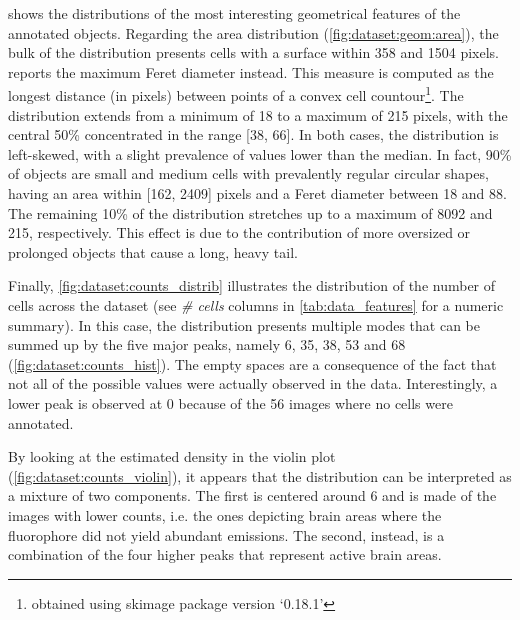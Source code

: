  shows the distributions of the most interesting geometrical features of the annotated objects.
Regarding the area distribution (\cref{fig:dataset:geom:area}), the bulk of the distribution presents cells with a surface within 358 and 1504 pixels.
 reports the maximum Feret diameter \cite{merkus2009particle} instead. This measure is computed as the longest distance (in pixels) between points of a convex cell countour\footnote{obtained using skimage package version `0.18.1'}.
The distribution extends from a minimum of 18 to a maximum of 215 pixels, with the central 50\% concentrated in the range [38, 66].
In both cases, the distribution is left-skewed, with a slight prevalence of values lower than the median.
In fact, 90\% of objects are small and medium cells with prevalently regular circular shapes, having an area within [162, 2409] pixels and a Feret diameter between 18 and 88.
The remaining 10\% of the distribution stretches up to a maximum of 8092 and 215, respectively.
This effect is due to the contribution of more oversized or prolonged objects that cause a long, heavy tail.

Finally, \ref{fig:dataset:counts_distrib} illustrates the distribution of the number of cells across the dataset (see \textit{\# cells} columns in \cref{tab:data_features} for a numeric summary).
In this case, the distribution presents multiple modes that can be summed up by the five major peaks, namely 6, 35, 38, 53 and 68
(\cref{fig:dataset:counts_hist}).
The empty spaces are a consequence of the fact that not all of the possible values were actually observed in the data.
Interestingly, a lower peak is observed at 0 because of the 56 images where no cells were annotated.

By looking at the estimated density in the violin plot (\cref{fig:dataset:counts_violin}), it appears that the distribution can be interpreted as a mixture of two components.
The first is centered around 6 and is made of the images with lower counts, i.e. the ones depicting brain areas where the fluorophore did not yield abundant emissions.
The second, instead, is a combination of the four higher peaks that represent active brain areas.


